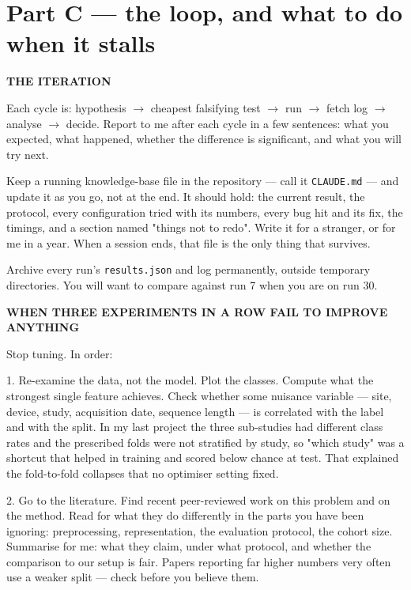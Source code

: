 \documentclass[11pt,a4paper]{article}
\begin{document}
\section{Part C --- the loop, and what to do when it stalls}

\begin{promptbox}
\small
\vspace{3pt}\textbf{THE ITERATION}

Each cycle is: hypothesis $\rightarrow$ cheapest falsifying test $\rightarrow$
run $\rightarrow$ fetch log $\rightarrow$ analyse $\rightarrow$ decide. Report to
me after each cycle in a few sentences: what you expected, what happened,
whether the difference is significant, and what you will try next.

Keep a running knowledge-base file in the repository --- call it
\texttt{CLAUDE.md} --- and update it as you go, not at the end. It should hold:
the current result, the protocol, every configuration tried with its numbers,
every bug hit and its fix, the timings, and a section named "things not to redo".
Write it for a stranger, or for me in a year. When a session ends, that file is
the only thing that survives.

Archive every run's \texttt{results.json} and log permanently, outside temporary
directories. You will want to compare against run 7 when you are on run 30.

\vspace{3pt}\textbf{WHEN THREE EXPERIMENTS IN A ROW FAIL TO IMPROVE ANYTHING}

Stop tuning. In order:

1. Re-examine the data, not the model. Plot the classes. Compute what the
strongest single feature achieves. Check whether some nuisance variable ---
site, device, study, acquisition date, sequence length --- is correlated with
the label and with the split. In my last project the three sub-studies had
different class rates and the prescribed folds were not stratified by study, so
"which study" was a shortcut that helped in training and scored below chance at
test. That explained the fold-to-fold collapses that no optimiser setting fixed.

2. Go to the literature. Find recent peer-reviewed work on this problem and on
the method. Read for what they do differently in the parts you have been
ignoring: preprocessing, representation, the evaluation protocol, the cohort
size. Summarise for me: what they claim, under what protocol, and whether the
comparison to our setup is fair. Papers reporting far higher numbers very often
use a weaker split --- check before you believe them.


\end{promptbox}
\end{document}
